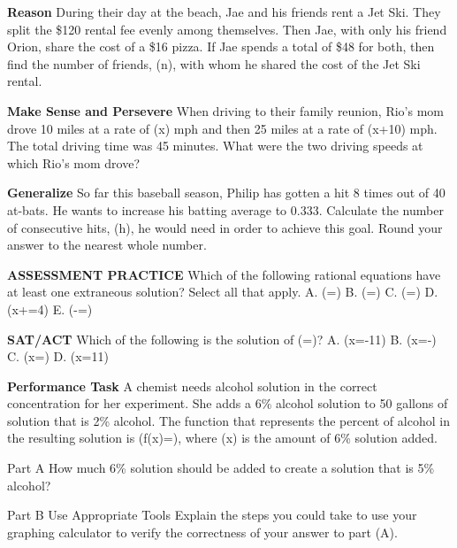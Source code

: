 \documentclass{article}
\newenvironment{practice}[2]{}{}        %
\newcommand{\answer}[1]{}               %
\newcommand{\placeholder}[2]{}          %
\newcommand{\te}[1]{}                   %
\begin{document}
\begin{practice}{28}{2}
\textbf{Reason} During their day at the beach, Jae and his friends rent a Jet Ski. They split the \$120 rental fee evenly among themselves. Then Jae, with only his friend Orion, share the cost of a \$16 pizza. If Jae spends a total of \$48 for both, then find the number of friends, (n), with whom he shared the cost of the Jet Ski rental.
\answer{(n=2) friends}
\end{practice}
\begin{practice}{29}{2}
\textbf{Make Sense and Persevere} When driving to their family reunion, Rio's mom drove 10 miles at a rate of (x) mph and then 25 miles at a rate of (x+10) mph. The total driving time was 45 minutes. What were the two driving speeds at which Rio's mom drove?
\answer{40 and 50 mi/h}
\end{practice}
\begin{practice}{30}{3}
\textbf{Generalize} So far this baseball season, Philip has gotten a hit 8 times out of 40 at-bats. He wants to increase his batting average to 0.333. Calculate the number of consecutive hits, (h), he would need in order to achieve this goal. Round your answer to the nearest whole number.
\answer{(h=8) hits}
\end{practice}
\begin{practice}{31}{1}
\textbf{ASSESSMENT PRACTICE} Which of the following rational equations have at least one extraneous solution? Select all that apply.
A. (=)
B. (=)
C. (=)
D. (x+=4)
E. (-=)
\answer{B, E}
\te{Printed choices are unlabeled checkboxes; A--E identify them in top-to-bottom order. Second and fifth boxes selected.}
\end{practice}
\begin{practice}{32}{1}
\textbf{SAT/ACT} Which of the following is the solution of (=)?
A. (x=-11)
B. (x=-)
C. (x=)
D. (x=11)
\answer{D}
\end{practice}
\begin{practice}{33}{3}
\textbf{Performance Task} A chemist needs alcohol solution in the correct concentration for her experiment. She adds a 6\% alcohol solution to 50 gallons of solution that is 2\% alcohol. The function that represents the percent of alcohol in the resulting solution is (f(x)=), where (x) is the amount of 6\% solution added.
\placeholder{illustration}{Chemist wearing goggles and gloves pours yellow liquid from a beaker into a large vessel. Labels: x gallons of 6 percent alcohol; 50 gallons of 2 percent alcohol.}
Part A How much 6\% solution should be added to create a solution that is 5\% alcohol?
\answer{150 gallons}
Part B Use Appropriate Tools Explain the steps you could take to use your graphing calculator to verify the correctness of your answer to part (A).
\answer{Using the graphing function of your calculator, enter (2.5+0.05x) for (y_1), and (1+0.06x) for (y_2). Then use the TABLE function to find the (y)-values of the function that are equivalent when (x=150).}
\end{practice}
\end{document}
